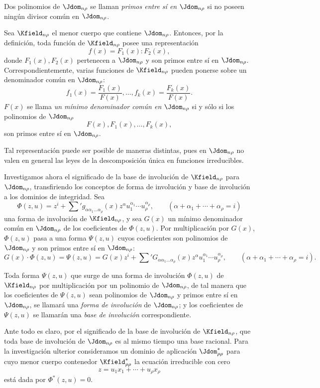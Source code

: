 \documentclass[11pt]{article}
\begin{document}
Dos polinomios de $\Jdom_{n\rho}$ se llaman \emph{primos entre sí en $\Jdom_{n\rho}$} si no poseen ningún divisor común en $\Jdom_{n\rho}$.

Sea $\Kfield_{n\rho}$ el menor cuerpo que contiene $\Jdom_{n\rho}$. Entonces, por la definición, toda función de $\Kfield_{n\rho}$ posee una representación
\[
  f(x)=F_1(x):F_2(x),
\]
donde $F_1(x),F_2(x)$ pertenecen a $\Jdom_{n\rho}$ y son primos entre sí en $\Jdom_{n\rho}$. Correspondientemente, varias funciones de $\Kfield_{n\rho}$ pueden ponerse sobre un denominador común en $\Jdom_{n\rho}$:
\[
  f_1(x)=\frac{F_1(x)}{F(x)},\ldots,
  f_k(x)=\frac{F_k(x)}{F(x)}.
\]
$F(x)$ se llama \emph{un mínimo denominador común en $\Jdom_{n\rho}$} si y sólo si los polinomios de $\Jdom_{n\rho}$
\[
  F(x),F_1(x),\ldots,F_k(x),
\]
son primos entre sí en $\Jdom_{n\rho}$.

Tal representación puede ser posible de maneras distintas, pues en $\Jdom_{n\rho}$ no valen en general las leyes de la descomposición única en funciones irreducibles.

Investigamos ahora el significado de la base de involución de $\Kfield_{n\rho}$ para $\Jdom_{n\rho}$, transfiriendo los conceptos de forma de involución y base de involución a los dominios de integridad. Sea
\[
  \Phi(z,u)=z^i+\sum{}' g_{\alpha\alpha_1\ldots\alpha_\rho}(x)
  z^\alpha u_1^{\alpha_1}\cdots u_\rho^{\alpha_\rho},
  \qquad
  (\alpha+\alpha_1+\cdots+\alpha_\rho=i)
\]
una forma de involución de $\Kfield_{n\rho}$, y sea $G(x)$ un mínimo denominador común en $\Jdom_{n\rho}$ de los coeficientes de $\Phi(z,u)$. Por multiplicación por $G(x)$, $\Phi(z,u)$ pasa a una forma $\Psi(z,u)$ cuyos coeficientes son polinomios de $\Jdom_{n\rho}$ y son primos entre sí en $\Jdom_{n\rho}$:
\[
  G(x)\cdot\Phi(z,u)=\Psi(z,u)
  =G(x)z^i+
  \sum{}' G_{\alpha\alpha_1\ldots\alpha_\rho}(x)
  z^\alpha u_1^{\alpha_1}\cdots u_\rho^{\alpha_\rho},
  \qquad
  (\alpha+\alpha_1+\cdots+\alpha_\rho=i).
\]

Toda forma $\Psi(z,u)$ que surge de una forma de involución $\Phi(z,u)$ de $\Kfield_{n\rho}$ por multiplicación por un polinomio de $\Jdom_{n\rho}$, de tal manera que los coeficientes de $\Psi(z,u)$ sean polinomios de $\Jdom_{n\rho}$ y primos entre sí en $\Jdom_{n\rho}$, se llamará una \emph{forma de involución} de $\Jdom_{n\rho}$; y los coeficientes de $\Psi(z,u)$ se llamarán una \emph{base de involución} correspondiente.

Ante todo es claro, por el significado de la base de involución de $\Kfield_{n\rho}$, que toda base de involución de $\Jdom_{n\rho}$ es al mismo tiempo una base racional. Para la investigación ulterior consideramos un dominio de aplicación $\Jdom^*_{\rho\rho}$ para cuyo menor cuerpo contenedor $\Kfield^*_{\rho\rho}$ la ecuación irreducible con cero
\[
  z=u_1x_1+\cdots+u_\rho x_\rho
\]
está dada por $\Phi^*(z,u)=0$.
\end{document}

